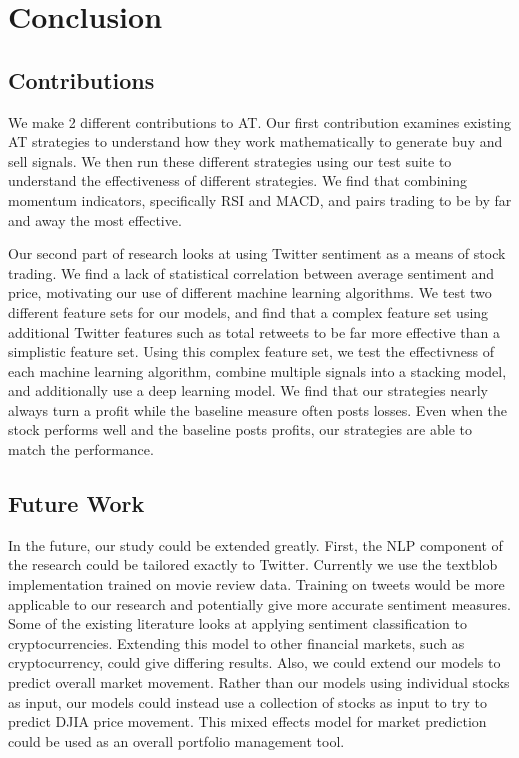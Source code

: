 \documentclass[../thesis.tex]{subfiles}
\begin{document}
\chapter{Conclusion}
\section{Contributions}
We make 2 different contributions to AT. Our first contribution examines existing AT strategies to understand how they work mathematically to generate buy and sell signals. We then run these different strategies using our test suite to understand the effectiveness of different strategies. We find that combining momentum indicators, specifically RSI and MACD, and pairs trading to be by far and away the most effective. 

Our second part of research looks at using Twitter sentiment as a means of stock trading. We find a lack of statistical correlation between average sentiment and price, motivating our use of different machine learning algorithms. We test two different feature sets for our models, and find that a complex feature set using additional Twitter features such as total retweets to be far more effective than a simplistic feature set. Using this complex feature set, we test the effectivness of each machine learning algorithm, combine multiple signals into a stacking model, and additionally use a deep learning model. We find that our strategies nearly always turn a profit while the baseline measure often posts losses. Even when the stock performs well and the baseline posts profits, our strategies are able to match the performance. 
\section{Future Work}
In the future, our study could be extended greatly. First, the NLP component of the research could be tailored exactly to Twitter. Currently we use the textblob implementation trained on movie review data. Training on tweets would be more applicable to our research and potentially give more accurate sentiment measures. Some of the existing literature looks at applying sentiment classification to cryptocurrencies. Extending this model to other financial markets, such as cryptocurrency, could give differing results. Also, we could extend our models to predict overall market movement. Rather than our models using individual stocks as input, our models could instead use a collection of stocks as input to try to predict DJIA price movement. This mixed effects model for market prediction could be used as an overall portfolio management tool. 
\end{document}
